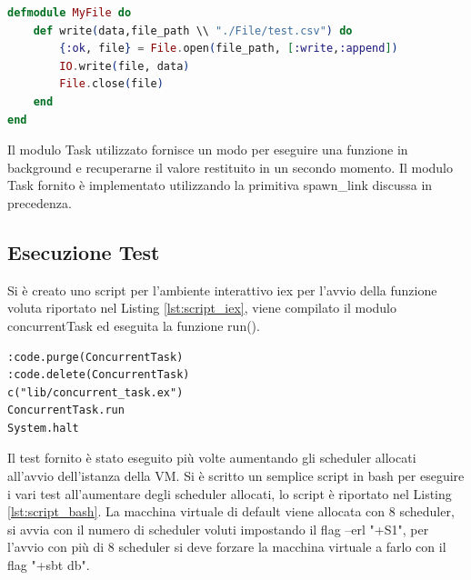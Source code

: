 \begin{lstlisting}[language=elixir, caption={Modulo MyFile},
	captionpos=b,label={lst:MyFile}]
defmodule MyFile do
	def write(data,file_path \\ "./File/test.csv") do
		{:ok, file} = File.open(file_path, [:write,:append])
		IO.write(file, data)
    	File.close(file)
	end 
end
\end{lstlisting}

Il modulo Task utilizzato fornisce un modo per eseguire
una funzione in background e recuperarne il valore
restituito in un secondo momento.
Il modulo Task fornito è
implementato utilizzando la primitiva spawn\_link discussa
in precedenza.


\subsection{Esecuzione Test}

Si è creato uno script per l'ambiente interattivo iex per l'avvio
della funzione voluta riportato nel Listing \ref{lst:script_iex},
viene compilato il modulo concurrentTask ed eseguita la funzione
run().

\begin{lstlisting}[language=none,captionpos=b,
	caption={Script iex per l'avvio dei test},
	label={lst:script_iex}]
:code.purge(ConcurrentTask)
:code.delete(ConcurrentTask)
c("lib/concurrent_task.ex")
ConcurrentTask.run
System.halt
\end{lstlisting}
	

Il test fornito è stato eseguito più volte aumentando
gli scheduler allocati all'avvio dell'istanza della VM.
Si è scritto un semplice script in bash per eseguire
i vari test all'aumentare degli scheduler allocati, lo script
è riportato nel Listing \ref{lst:script_bash}.
La macchina virtuale di default viene allocata con 8
scheduler, si avvia con il numero di scheduler voluti
impostando il flag --erl "+S1", per l'avvio con più
di 8 scheduler si deve forzare la macchina virtuale
a farlo con il flag "+sbt db".

